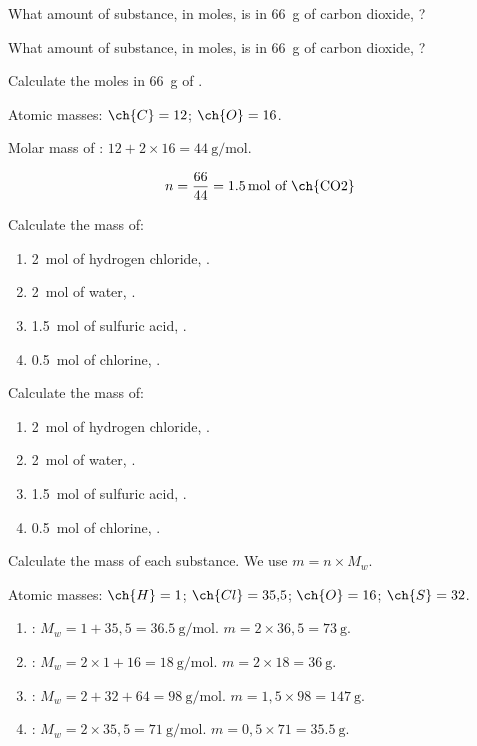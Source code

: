 \begin{exercise}
    What amount of substance, in moles, is in \qty{66}{\g} of carbon dioxide, ?
    \begin{solu}
        What amount of substance, in moles, is in \qty{66}{\g} of carbon dioxide, ?

        Calculate the moles in \qty{66}{\g} of .

        Atomic masses: \( \ch{C} = 12 \); \( \ch{O} = 16 \).

        Molar mass of : \( 12 + 2 \times 16 = \qty{44}{\g\per\mole} \).

        \begin{equation*}
            n = \dfrac{66}{44} = \qty{1.5}{\mole} \text{ of \ch{CO2}}
        \end{equation*}
    \end{solu}
\end{exercise}

\begin{exercise}
    Calculate the mass of:
    \begin{enumerate}[label=\letraminuscula]
\item \qty{2}{\mole} of hydrogen chloride, .
\item \qty{2}{\mole} of water, .
\item \qty{1.5}{\mole} of sulfuric acid, .
\item \qty{0.5}{\mole} of chlorine, .
    \end{enumerate}
    \begin{solu}
        Calculate the mass of:
        \begin{enumerate}[label=\letraminuscula]
\item \qty{2}{\mole} of hydrogen chloride, .
\item \qty{2}{\mole} of water, .
\item \qty{1.5}{\mole} of sulfuric acid, .
\item \qty{0.5}{\mole} of chlorine, .
        \end{enumerate}

        Calculate the mass of each substance. We use \( m = n \times M_w \).

        Atomic masses: \( \ch{H} = 1 \); \( \ch{Cl} = 35{,}5 \); \( \ch{O} = 16 \); \( \ch{S} = 32 \).

        \begin{enumerate}[label=\letraminuscula]
\item {}: \( M_w = 1 + 35{,}5 = \qty{36.5}{\g\per\mole} \). \( m = 2 \times 36{,}5 = \qty{73}{\g} \).
\item {}: \( M_w = 2 \times 1 + 16 = \qty{18}{\g\per\mole} \). \( m = 2 \times 18 = \qty{36}{\g} \).
\item {}: \( M_w = 2 + 32 + 64 = \qty{98}{\g\per\mole} \). \( m = 1{,}5 \times 98 = \qty{147}{\g} \).
\item {}: \( M_w = 2 \times 35{,}5 = \qty{71}{\g\per\mole} \). \( m = 0{,}5 \times 71 = \qty{35.5}{\g} \).
        \end{enumerate}
    \end{solu}
\end{exercise}

